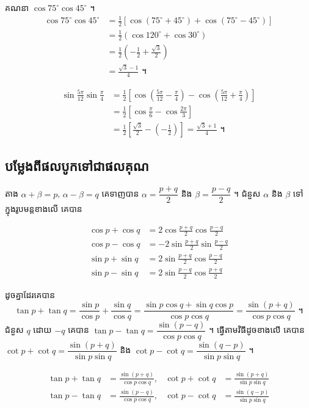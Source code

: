 \begin{example}[ឧទាហរណ៍ ១២]
គណនា $\cos 75^\circ\cos 45^\circ$ ។
\[
\begin{aligned}
\cos 75^\circ\cos 45^\circ &= \frac{1}{2}[\cos(75^\circ + 45^\circ) + \cos(75^\circ - 45^\circ)]\\
&= \frac{1}{2}(\cos 120^\circ + \cos 30^\circ)\\
&= \frac{1}{2}\left(-\frac{1}{2} + \frac{\sqrt{3}}{2}\right)\\
&= \frac{\sqrt{3} - 1}{4} \text{ ។}
\end{aligned}
\]
\end{example}

\begin{example}[ឧទាហរណ៍ ១៣]
\[
\begin{aligned}
\sin\frac{5\pi}{12}\sin\frac{\pi}{4} &= \frac{1}{2}\left[\cos\left(\frac{5\pi}{12} - \frac{\pi}{4}\right) - \cos\left(\frac{5\pi}{12} + \frac{\pi}{4}\right)\right]\\
&= \frac{1}{2}\left[\cos\frac{\pi}{6} - \cos\frac{2\pi}{3}\right]\\
&= \frac{1}{2}\left[\frac{\sqrt{3}}{2} - \left(-\frac{1}{2}\right)\right] = \frac{\sqrt{3} + 1}{4} \text{ ។}
\end{aligned}
\]
\end{example}

\subsection{បម្លែងពីផលបូកទៅជាផលគុណ}

តាង $\alpha + \beta = p$, $\alpha - \beta = q$ គេទាញបាន $\alpha = \dfrac{p + q}{2}$ និង $\beta = \dfrac{p - q}{2}$ ។ ជំនួស $\alpha$ និង $\beta$ ទៅក្នុងរូបមន្តខាងលើ គេបាន
\begin{formulaBox}[រូបមន្ត]
\[
\begin{aligned}
\cos p + \cos q &= 2\cos\frac{p + q}{2}\cos\frac{p - q}{2}\\
\cos p - \cos q &= -2\sin\frac{p + q}{2}\sin\frac{p - q}{2}\\
\sin p + \sin q &= 2\sin\frac{p + q}{2}\cos\frac{p - q}{2}\\
\sin p - \sin q &= 2\sin\frac{p - q}{2}\cos\frac{p + q}{2}
\end{aligned}
\]
\end{formulaBox}
ដូចគ្នាដែរគេបាន
\[ \tan p + \tan q = \frac{\sin p}{\cos p} + \frac{\sin q}{\cos q} = \frac{\sin p\cos q + \sin q\cos p}{\cos p\cos q} = \frac{\sin(p + q)}{\cos p\cos q} \text{ ។} \]
ជំនួស $q$ ដោយ $-q$ គេបាន $\tan p - \tan q = \dfrac{\sin(p - q)}{\cos p\cos q}$ ។ ធ្វើតាមវិធីដូចខាងលើ គេបាន $\cot p + \cot q = \dfrac{\sin(p + q)}{\sin p\sin q}$ និង $\cot p - \cot q = \dfrac{\sin(q - p)}{\sin p\sin q}$ ។
\begin{formulaBox}[ដូច្នេះ]
\[
\begin{aligned}
\tan p + \tan q &= \frac{\sin(p + q)}{\cos p\cos q}, & \cot p + \cot q &= \frac{\sin(p + q)}{\sin p\sin q}\\
\tan p - \tan q &= \frac{\sin(p - q)}{\cos p\cos q}, & \cot p - \cot q &= \frac{\sin(q - p)}{\sin p\sin q}
\end{aligned}
\]
\end{formulaBox}

